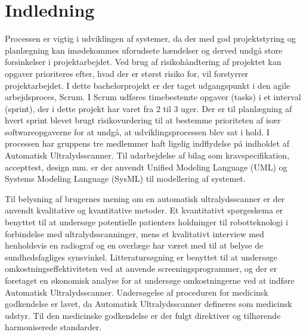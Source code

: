 \chapter{Indledning}\label{kapInd}
Processen er vigtig i udviklingen af systemer, da der med god projektstyring og planlægning kan imødekommes uforudsete hændelser og derved undgå store forsinkelser i projektarbejdet. Ved brug af risikohåndtering af projektet kan opgaver prioriteres efter, hvad der er størst risiko for, vil forstyrrer projektarbejdet. I dette bachelorprojekt er der taget udgangspunkt i den agile arbejdsproces, Scrum. I Scrum udføres timebestemte opgaver (tasks) i et interval (sprint), der i dette projekt har varet fra 2 til 3 uger. Der er til planlægning af hvert sprint blevet brugt risikovurdering til at bestemme prioriteten af især softwareopgaverne for at undgå, at udviklingsprocessen blev sat i hold. 
I processen har gruppens tre medlemmer haft ligelig indflydelse på indholdet af Automatisk Ultralydsscanner. Til udarbejdelse af bilag som kravspecifikation, accepttest, design mm. er der anvendt Unified Modeling Language (UML) og Systems Modeling Language (SysML) til modellering af systemet.

Til belysning af brugernes mening om en automatisk ultralydsscanner er der anvendt kvalitative og kvantitative metoder. Et kvantitativt spørgeskema er benyttet til at undersøge potentielle patienters
holdninger til robotteknologi i forbindelse med ultralydsscanninger, mens et kvalitativt
interview med henholdsvis en radiograf og en overlæge har været med til at belyse de sundhedsfagliges
synsvinkel. Litteratursøgning er benyttet til at undersøge omkostningseffektiviteten ved at anvende screeningsprogrammer, og der er foretaget en økonomisk analyse for at undersøge omkostningerne ved at indføre Automatisk Ultralydsscanner. Undersøgelse af proceduren for medicinsk godkendelse er lavet, da Automatisk Ultralydsscanner defineres som medicinsk udstyr. Til den medicinske godkendelse er der fulgt direktiver og tilhørende harmoniserede standarder. 



